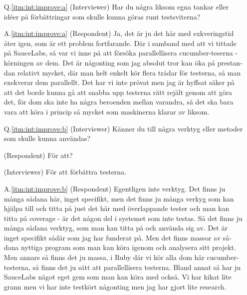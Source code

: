 \begin{otherlanguage}{swedish}
\begin{itemize}
  \item[Q.\ref{itm:int:improve:a}] (Interviewer) Har du några liksom egna tankar eller idéer på förbättringar som skulle kunna göras runt testsviterna?
  \item[A.\ref{itm:int:improve:a}] (Respondent) Ja, det är ju det här med exkveringstid åter igen, som är ett problem fortfarande. Där i samband med att vi tittade på SauceLabs, så var vi inne på att försöka parallellisera cucumber-teserna - körningen av dem. Det är någonting som jag absolut tror kan öka på prestandan relativt mycket, där man helt enkelt kör flera trådar för testerna, så man exekverar dem parallellt. Det har vi inte prövat men jag är hyffsat säker på att det borde kunna gå att snabba upp testerna rätt rejält genom att göra det, för dom ska inte ha några beroenden mellan varandra, så det ska bara vara att köra i princip så mycket som maskinerna klarar av liksom.
  
  \item[Q.\ref{itm:int:improve:b}] (Interviewer) Känner du till några verktyg eller metoder som skulle kunna användas?
  \item[] (Respondent) För att?
  \item[] (Interviewer) För att förbättra testerna.
  \item[A.\ref{itm:int:improve:b}] (Respondent) Egentligen inte verktyg. Det finns ju många sådana här, inget specifikt, men det finns ju många verkyg som kan hjälpa till och titta på just det här med överlappande tester och man kan titta på coverage - är det någon del i systemet som inte testas. Så det finns ju många sådana verktyg, som man kan titta på och använda sig av. Det är inget specifikt sådär som jag har funderat på. Men det finns massor av sådana nyttiga program som man kan köra igenom och analysera sitt projekt. Men annars så finns det ju massa, i Ruby där vi kör alla dom här cucumber-testerna, så finns det ju sätt att parallellisera testerna. Bland annat så har ju SauceLabs något eget gem som man kan köra med också. Vi har kikat lite grann men vi har inte testkört någonting men jag har gjort lite research.
  

\end{itemize}
\end{otherlanguage}
